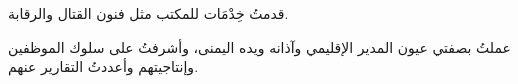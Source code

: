 \begin{achievements}
	\item قدمتُ خِدْمَات للمكتب مثل فنون القتال والرقابة.
	\item عملتُ بصفتي عيون المدير الإقليمي وآذانه ويده اليمنى، وأشرفتُ على سلوك الموظفين وإنتاجيتهم وأعددتُ التقارير عنهم.
\end{achievements}
